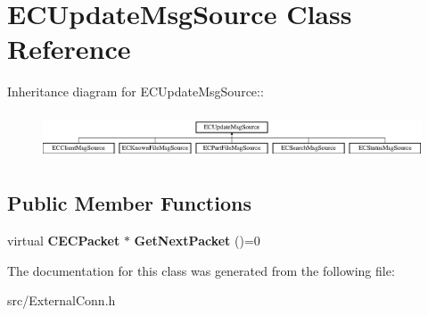 \section{ECUpdateMsgSource Class Reference}
\label{classECUpdateMsgSource}
Inheritance diagram for ECUpdateMsgSource::\begin{figure}[H]
\begin{center}
\leavevmode
\includegraphics[height=1.3913cm]{classECUpdateMsgSource}
\end{center}
\end{figure}
\subsection*{Public Member Functions}
\begin{DoxyCompactItemize}
\item 
virtual {\bf CECPacket} $\ast$ {\bfseries GetNextPacket} ()=0\label{classECUpdateMsgSource_a2b4350b4dc34622127eb3cf4782eed88}

\end{DoxyCompactItemize}


The documentation for this class was generated from the following file:\begin{DoxyCompactItemize}
\item 
src/ExternalConn.h\end{DoxyCompactItemize}
